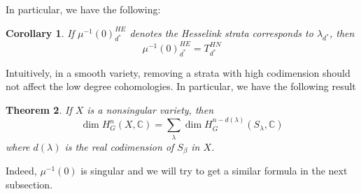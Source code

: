 \documentclass[12pt]{amsart}
\theoremstyle{plain}
\newtheorem{thm}{Theorem}[section]
\newtheorem{cor}[thm]{Corollary}
\theoremstyle{definition}
\theoremstyle{remark}
\begin{document}
\hspace{-12pt}In particular, we have the following:
\begin{cor}
    If $\mu^{-1}(0)_{d^*}^{HE}$ denotes the Hesselink strata corresponds to $\lambda_{d^*}$, then
    $$\mu^{-1}(0)_{d^*}^{HE}=T_{d^*}^{HN}$$
\end{cor}
\hspace{-12pt}Intuitively, in a smooth variety, removing a strata with high codimension should not affect the low degree cohomologies. In particular, we have the following result
\begin{thm}
    \cite{kirwan1984cohomology} If $X$ is a nonsingular variety, then
    $$\dim H^n_G(X,\mathbb C)=\sum_{\lambda}\dim H_G^{n-d(\lambda)}(S_{\lambda},\mathbb C)$$
    where $d(\lambda)$ is the real codimension of $S_{\beta}$ in $X$.
\end{thm}
\hspace{-12pt}Indeed, $\mu^{-1}(0)$ is singular and we will try to get a similar formula in the next subsection.
\end{document}
